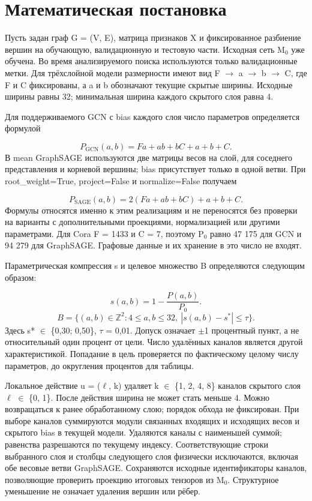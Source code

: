 \documentclass[10pt,a4paper]{article}
\begin{document}
\section*{Математическая постановка}
Пусть задан граф G = (V, E), матрица признаков X и фиксированное разбиение вершин на обучающую, валидационную и тестовую части. Исходная сеть M$_0$ уже обучена. Во время анализируемого поиска используются только валидационные метки. Для трёхслойной модели размерности имеют вид F $\to$ a $\to$ b $\to$ C, где F и C фиксированы, а a и b обозначают текущие скрытые ширины. Исходные ширины равны 32; минимальная ширина каждого скрытого слоя равна 4.

Для поддерживаемого GCN с bias каждого слоя число параметров определяется формулой

\begin{equation}
P_{\mathrm{GCN}}(a,b)=Fa+ab+bC+a+b+C.
\end{equation}
В mean GraphSAGE используются две матрицы весов на слой, для соседнего представления и корневой вершины; bias присутствует только в одной ветви. При root\_weight=True, project=False и normalize=False получаем

\begin{equation}
P_{\mathrm{SAGE}}(a,b)=2(Fa+ab+bC)+a+b+C.
\end{equation}
Формулы относятся именно к этим реализациям и не переносятся без проверки на варианты с дополнительными проекциями, нормализацией или другими параметрами. Для Cora F = 1433 и C = 7, поэтому P$_0$ равно 47 175 для GCN и 94 279 для GraphSAGE. Графовые данные и их хранение в это число не входят.

Параметрическая компрессия s и целевое множество B определяются следующим образом:

\begin{equation}
s(a,b)=1-\frac{P(a,b)}{P_0}.
\end{equation}
\begin{equation}
B=\{(a,b)\in\mathbb{Z}^2:4\leq a,b\leq32,\ |s(a,b)-s^*|\leq\tau\}.
\end{equation}
Здесь s* $\in$ \{0,30; 0,50\}, $\tau$ = 0,01. Допуск означает $\pm$1 процентный пункт, а не относительный один процент от цели. Число удалённых каналов является другой характеристикой. Попадание в цель проверяется по фактическому целому числу параметров, до округления процентов для таблицы.

Локальное действие u = ($\ell$, k) удаляет k $\in$ \{1, 2, 4, 8\} каналов скрытого слоя $\ell$ $\in$ \{0, 1\}. После действия ширина не может стать меньше 4. Можно возвращаться к ранее обработанному слою; порядок обхода не фиксирован. При выборе каналов суммируются модули связанных входящих и исходящих весов и скрытого bias в текущей модели. Удаляются каналы с наименьшей суммой; равенства разрешаются по текущему индексу. Соответствующие строки выбранного слоя и столбцы следующего слоя физически исключаются, включая обе весовые ветви GraphSAGE. Сохраняются исходные идентификаторы каналов, позволяющие проверить проекцию итоговых тензоров из M$_0$. Структурное уменьшение не означает удаления вершин или рёбер.
\end{document}
